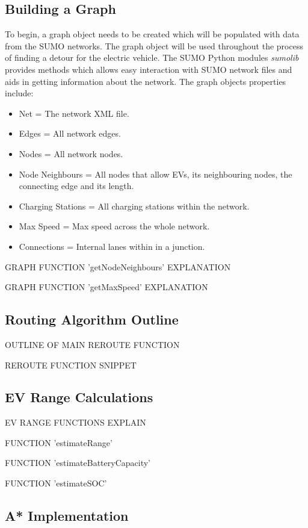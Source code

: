 \documentclass[11pt]{report}
\begin{document}
\subsection{Building a Graph}

To begin, a graph object needs to be created which will be populated with data from the SUMO networks. The graph object will be used throughout the process of finding a detour for the electric vehicle. The SUMO Python modules \emph{sumolib} provides methods which allows easy interaction with SUMO network files and aids in getting information about the network. The graph objects properties include:

\begin{itemize}
  \item Net = The network XML file.
  \item Edges = All network edges.
  \item Nodes = All network nodes.
  \item Node Neighbours = All nodes that allow EVs, its neighbouring nodes, the connecting edge and its length.
  \item Charging Stations = All charging stations within the network.
  \item Max Speed = Max speed across the whole network.
  \item Connections = Internal lanes within in a junction.
\end{itemize}

GRAPH FUNCTION 'getNodeNeighbours' EXPLANATION

GRAPH FUNCTION 'getMaxSpeed' EXPLANATION

\subsection{Routing Algorithm Outline}

OUTLINE OF MAIN REROUTE FUNCTION


REROUTE FUNCTION SNIPPET

\subsection{EV Range Calculations}

EV RANGE FUNCTIONS EXPLAIN

FUNCTION 'estimateRange'

FUNCTION 'estimateBatteryCapacity'

FUNCTION 'estimateSOC'

\subsection{A* Implementation}
\end{document}
